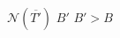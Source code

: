\documentclass[preview]{standalone}
\begin{document}
$\mathcal{N}\left(\overline{T'}\right)$  $B'$  $B'>B$\\
\end{document}
